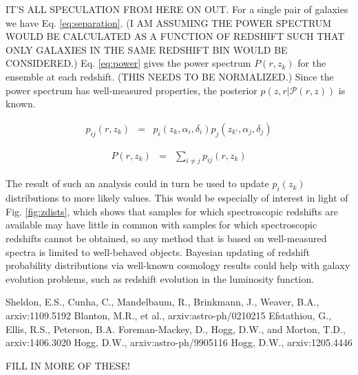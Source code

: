 \documentclass[12pt, onecolumn]{emulateapj}
\begin{document}
IT'S ALL SPECULATION FROM HERE ON OUT.  For a single pair of galaxies we have Eq. \ref{eq:separation}.  (I AM ASSUMING THE POWER SPECTRUM WOULD BE CALCULATED AS A FUNCTION OF REDSHIFT SUCH THAT ONLY GALAXIES IN THE SAME REDSHIFT BIN WOULD BE CONSIDERED.)  Eq. \ref{eq:power} gives the power spectrum $P(r,z_{k})$ for the ensemble at each redshift.  (THIS NEEDS TO BE NORMALIZED.)  Since the power spectrum has well-measured properties, the posterior $p(z,r|\mathcal{P}(r,z))$ is known.  

\begin{eqnarray}
\label{eq:separation}
p_{ij}(r,z_{k}) &=& p_{i}(z_{k},\alpha_{i},\delta_{i})p_{j}(z_{k'},\alpha_{j},\delta_{j})
\end{eqnarray}

\begin{eqnarray}
\label{eq:power}
P(r,z_{k}) &=& \sum_{i\neq j}p_{ij}(r,z_{k})
\end{eqnarray}

The result of such an analysis could in turn be used to update $p_{i}(z_{k})$ distributions to more likely values.  This would be especially of interest in light of Fig. \ref{fig:zdists}, which shows that samples for which spectroscopic redshifts are available may have little in common with samples for which spectroscopic redshifts cannot be obtained, so any method that is based on well-measured spectra is limited to well-behaved objects.  Bayesian updating of redshift probability distributions via well-known cosmology results could help with galaxy evolution problems, such as redshift evolution in the luminosity function.



\begin{thebibliography}{}
Sheldon, E.S., Cunha, C., Mandelbaum, R., Brinkmann, J., Weaver, B.A., arxiv:1109.5192
Blanton, M.R., et al., arxiv:astro-ph/0210215
Efstathiou, G., Ellis, R.S., Peterson, B.A.
Foreman-Mackey, D., Hogg, D.W., and Morton, T.D., arxiv:1406.3020
Hogg, D.W., arxiv:astro-ph/9905116
Hogg, D.W., arxiv:1205.4446

FILL IN MORE OF THESE!
\end{thebibliography}
\end{document}
